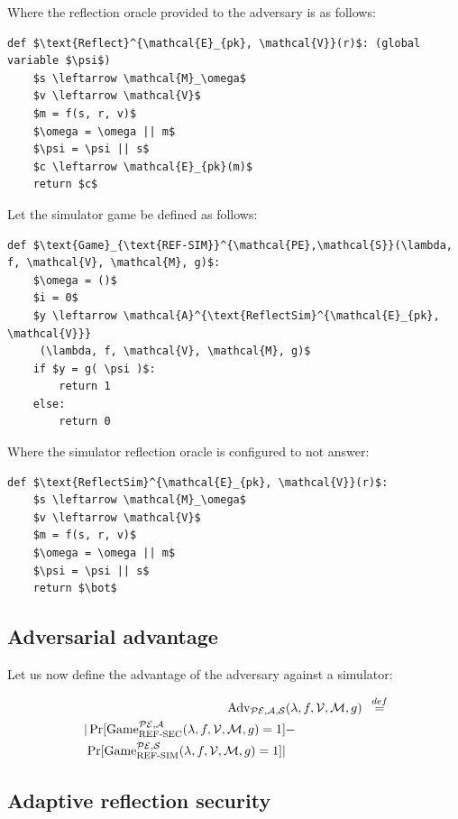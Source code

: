 \documentclass[conference, letterpaper, 10pt]{IEEEtran}
\newcommand\defeq{\stackrel{\mathclap{\normalfont\mbox{def}}}{=}}
\begin{document}
Where the reflection oracle provided to the adversary is as follows:

\begin{lstlisting}[texcl,mathescape]
def $\text{Reflect}^{\mathcal{E}_{pk}, \mathcal{V}}(r)$: (global variable $\psi$)
    $s \leftarrow \mathcal{M}_\omega$
    $v \leftarrow \mathcal{V}$
    $m = f(s, r, v)$
    $\omega = \omega || m$
    $\psi = \psi || s$
    $c \leftarrow \mathcal{E}_{pk}(m)$
    return $c$
\end{lstlisting}

Let the simulator game be defined as follows:

\begin{lstlisting}[texcl,mathescape]
def $\text{Game}_{\text{REF-SIM}}^{\mathcal{PE},\mathcal{S}}(\lambda, f, \mathcal{V}, \mathcal{M}, g)$:
    $\omega = ()$
    $i = 0$
    $y \leftarrow \mathcal{A}^{\text{ReflectSim}^{\mathcal{E}_{pk}, \mathcal{V}}}
     (\lambda, f, \mathcal{V}, \mathcal{M}, g)$
    if $y = g( \psi )$:
        return 1
    else:
        return 0
\end{lstlisting}

Where the simulator reflection oracle is configured to not answer:

\begin{lstlisting}[texcl,mathescape]
def $\text{ReflectSim}^{\mathcal{E}_{pk}, \mathcal{V}}(r)$:
    $s \leftarrow \mathcal{M}_\omega$
    $v \leftarrow \mathcal{V}$
    $m = f(s, r, v)$
    $\omega = \omega || m$
    $\psi = \psi || s$
    return $\bot$
\end{lstlisting}

\subsection{Adversarial advantage}\label{subsec:refsecadv}

Let us now define the advantage of the adversary against a simulator:

\begin{align*}
    \text{Adv}_{\mathcal{PE}, \mathcal{A}, \mathcal{S}}&(\lambda, f, \mathcal{V}, \mathcal{M}, g) &\defeq\\
    |\Pr[\text{Game}_{\text{REF-SEC}}^{\mathcal{PE},\mathcal{A}}(\lambda, f, \mathcal{V}, \mathcal{M}, g) = 1] &-\\
    \Pr[\text{Game}_{\text{REF-SIM}}^{\mathcal{PE},\mathcal{S}}(\lambda, f, \mathcal{V}, \mathcal{M}, g) = 1]| &
\end{align*}

\subsection{Adaptive reflection security}\label{subsec:adaptiverefsec}
\end{document}
